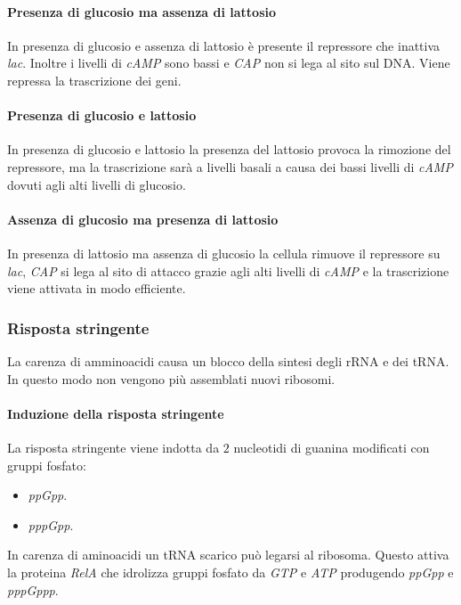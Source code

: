 			\paragraph{Presenza di glucosio ma assenza di lattosio}
			In presenza di glucosio e assenza di lattosio \`e presente il repressore che inattiva \emph{lac}.
			Inoltre i livelli di \emph{cAMP} sono bassi e \emph{CAP} non si lega al sito sul DNA.
			Viene repressa la trascrizione dei geni.

			\paragraph{Presenza di glucosio e lattosio}
			In presenza di glucosio e lattosio la presenza del lattosio provoca la rimozione del repressore, ma la trascrizione sar\`a a livelli basali a causa dei bassi livelli di \emph{cAMP} dovuti agli alti livelli di glucosio.

			\paragraph{Assenza di glucosio ma presenza di lattosio}
			In presenza di lattosio ma assenza di glucosio la cellula rimuove il repressore su \emph{lac}, \emph{CAP} si lega al sito di attacco grazie agli alti livelli di \emph{cAMP} e la trascrizione viene attivata in modo efficiente.

		\subsubsection{Risposta stringente}
		La carenza di amminoacidi causa un blocco della sintesi degli rRNA e dei tRNA.
		In questo modo non vengono pi\`u assemblati nuovi ribosomi.

			\paragraph{Induzione della risposta stringente}
			La risposta stringente viene indotta da $2$ nucleotidi di guanina modificati con gruppi fosfato:
			\begin{multicols}{2}
				\begin{itemize}
					\item \emph{ppGpp}.
					\item \emph{pppGpp}.
				\end{itemize}
			\end{multicols}
			In carenza di aminoacidi un tRNA scarico può legarsi al ribosoma.
			Questo attiva la proteina \emph{RelA} che idrolizza gruppi fosfato da \emph{GTP} e \emph{ATP} produgendo \emph{ppGpp} e \emph{pppGppp}.

